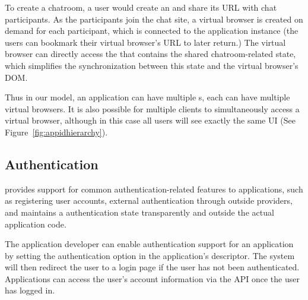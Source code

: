 To create a chatroom, a user would create an \appins{} and share
its URL with chat participants. As the participants join the chat site, a
virtual browser is created on demand for each participant, which is connected
to the application instance (the users can bookmark their virtual browser's
URL to later return.) The virtual browser can directly access the \appins
that contains the shared chatroom-related state, which simplifies the 
synchronization between this state and the virtual browser's DOM.

\apphierarchyfig{}

Thus in our model, 
an application can have multiple \appins{}s,
each \appins{} can have multiple virtual browsers.
It is also possible for multiple clients to simultaneously access a virtual browser,
although in this case all users will see exactly the same UI 
(See Figure~\ref{fig:appidhierarchy}).






\subsection{Authentication}

\cb provides support for common authentication-related features
to applications, such as registering user accounts, external authentication
through outside providers, and maintains a authentication state transparently
and outside the actual application code.

The application developer can enable authentication support for an
application by setting the authentication option in the application's descriptor.
The system will then redirect the user to a login page if the
user has not been authenticated.
Applications can access the user's account information via the \cb API 
once the user has logged in.

